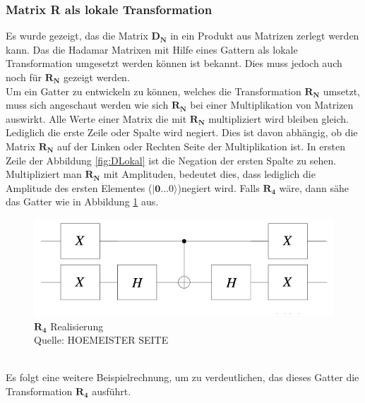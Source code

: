 \subsubsection{Matrix R als lokale Transformation}
Es wurde gezeigt, das die Matrix $\mathbf{D_N}$ in ein Produkt aus Matrizen zerlegt werden kann. Das die Hadamar Matrixen mit Hilfe eines Gattern als lokale Transformation umgesetzt werden können ist bekannt. Dies muss jedoch auch noch für $\mathbf{R_N}$ gezeigt werden. 
\\
Um ein Gatter zu entwickeln zu können, welches die Transformation $\mathbf{R_N}$ umsetzt, muss sich angeschaut werden wie sich $\mathbf{R_N}$ bei einer Multiplikation von Matrizen auswirkt. Alle Werte einer Matrix die mit $\mathbf{R_N}$ multipliziert wird bleiben gleich. Lediglich die erste Zeile oder Spalte wird negiert. Dies ist davon abhängig, ob die Matrix $\mathbf{R_N}$ auf der Linken oder Rechten Seite der Multiplikation ist. In ersten Zeile der Abbildung \ref{fig:DLokal} ist die Negation der ersten Spalte zu sehen.
\\
Multipliziert man $\mathbf{R_N}$ mit Amplituden, bedeutet dies, dass lediglich die Amplitude des ersten Elementes ($\mathbf{|0...0\rangle}$)negiert wird.
Falls $\mathbf{R_4}$ wäre, dann sähe das Gatter wie in Abbildung \ref{fig:Rgatter} aus.
 \begin{figure}[hbtp]
 	\centering
 	\includegraphics[width=.8\textwidth]{figures/rgatter.png}
 	\caption{$\mathbf{R_4}$ Realisierung \\ Quelle: HOEMEISTER SEITE}
 	\label{fig:Rgatter}
 \end{figure}
\\
Es folgt eine weitere Beispielrechnung, um zu verdeutlichen, das dieses Gatter die Transformation $\mathbf{R_4}$ ausführt.
